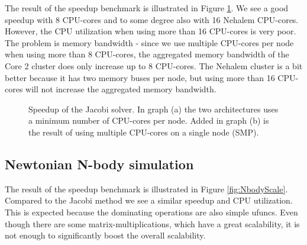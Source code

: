 \documentclass[10pt]{article}
\begin{document}
The result of the speedup benchmark is illustrated in Figure \ref{fig:JacobiScale}. We see a good speedup with 8 CPU-cores and to some degree also with 16 Nehalem CPU-cores. However, the CPU utilization when using more than 16 CPU-cores is very poor. The problem is memory bandwidth - since we use multiple CPU-cores per node when using more than 8 CPU-cores, the aggregated memory bandwidth of the Core 2 cluster does only increase up to 8 CPU-cores. The Nehalem cluster is a bit better because it has two memory buses per node, but using more than 16 CPU-cores will not increase the aggregated memory bandwidth.

\begin{figure}%
  \begin{center}%
    \caption{Speedup of the Jacobi solver. In graph (a) the two architectures uses a minimum number of CPU-cores per node. Added in graph (b) is the result of using multiple CPU-cores on a single node (SMP).}%
    \label{fig:JacobiScale}%
  \end{center}
\end{figure}


\subsection{Newtonian N-body simulation}
The result of the speedup benchmark is illustrated in Figure \ref{fig:NbodyScale}. Compared to the Jacobi method we see a similar speedup and CPU utilization. This is expected because the dominating operations are also simple ufuncs. Even though there are some matrix-multiplications, which have a great scalability, it is not enough to significantly boost the overall scalability.
\end{document}
